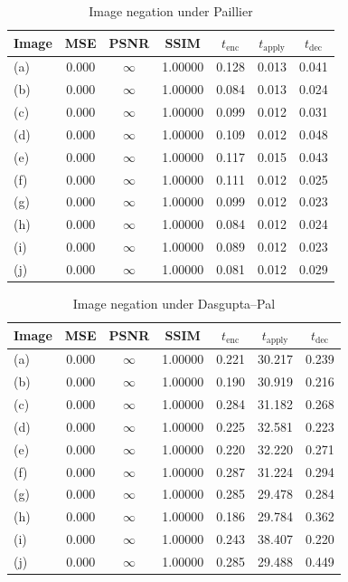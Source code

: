 \begin{table}[h]
	\centering
	\caption{Image negation under Paillier}
	\label{tbl:neg-pal}
    \begin{tabular}{lcccccc}
        \toprule
        Image & MSE  & PSNR & SSIM & $t_\text{enc}$ & $t_\text{apply}$ & $t_\text{dec}$ \\ \midrule
        (a) & 0.000 & $\infty$ & 1.00000 & 0.128 & 0.013 & 0.041 \\
		(b) & 0.000 & $\infty$ & 1.00000 & 0.084 & 0.013 & 0.024 \\
		(c) & 0.000 & $\infty$ & 1.00000 & 0.099 & 0.012 & 0.031 \\
		(d) & 0.000 & $\infty$ & 1.00000 & 0.109 & 0.012 & 0.048 \\
		(e) & 0.000 & $\infty$ & 1.00000 & 0.117 & 0.015 & 0.043 \\
		(f) & 0.000 & $\infty$ & 1.00000 & 0.111 & 0.012 & 0.025 \\
		(g) & 0.000 & $\infty$ & 1.00000 & 0.099 & 0.012 & 0.023 \\
		(h) & 0.000 & $\infty$ & 1.00000 & 0.084 & 0.012 & 0.024 \\
		(i) & 0.000 & $\infty$ & 1.00000 & 0.089 & 0.012 & 0.023 \\
		(j) & 0.000 & $\infty$ & 1.00000 & 0.081 & 0.012 & 0.029 \\
		\bottomrule
    \end{tabular}
\end{table}
\begin{table}[h]
	\centering
	\caption{Image negation under Dasgupta--Pal}
	\label{tbl:neg-dp}
    \begin{tabular}{lcccccc}
        \toprule
        Image & MSE  & PSNR & SSIM & $t_\text{enc}$ & $t_\text{apply}$ & $t_\text{dec}$ \\ \midrule
		(a) & 0.000 & $\infty$ & 1.00000 & 0.221 & 30.217 & 0.239 \\
		(b) & 0.000 & $\infty$ & 1.00000 & 0.190 & 30.919 & 0.216 \\
		(c) & 0.000 & $\infty$ & 1.00000 & 0.284 & 31.182 & 0.268 \\
		(d) & 0.000 & $\infty$ & 1.00000 & 0.225 & 32.581 & 0.223 \\
		(e) & 0.000 & $\infty$ & 1.00000 & 0.220 & 32.220 & 0.271 \\
		(f) & 0.000 & $\infty$ & 1.00000 & 0.287 & 31.224 & 0.294 \\
		(g) & 0.000 & $\infty$ & 1.00000 & 0.285 & 29.478 & 0.284 \\
		(h) & 0.000 & $\infty$ & 1.00000 & 0.186 & 29.784 & 0.362 \\
		(i) & 0.000 & $\infty$ & 1.00000 & 0.243 & 38.407 & 0.220 \\
		(j) & 0.000 & $\infty$ & 1.00000 & 0.285 & 29.488 & 0.449 \\		
		\bottomrule
        \end{tabular}
\end{table}

